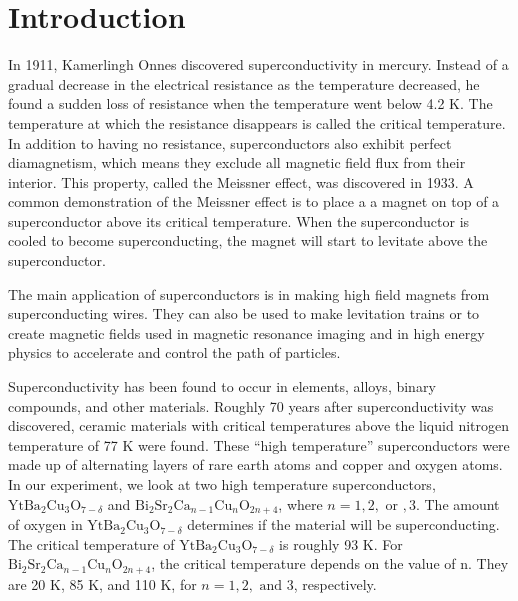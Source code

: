 \documentclass[prb,preprint]{revtex4-1}
\begin{document}
\maketitle %


\section{Introduction} %
In 1911, Kamerlingh Onnes discovered superconductivity in mercury.  
Instead of a gradual decrease in the electrical resistance as the temperature decreased, he found a sudden loss of resistance when the temperature went below 4.2 K. 
The temperature at which the resistance disappears is called the critical temperature.
In addition to having no resistance, superconductors also exhibit perfect diamagnetism, which means they exclude all magnetic field flux from their interior. 
This property, called the Meissner effect, was discovered in 1933.\cite{intro}
A common demonstration of the Meissner effect is to place a a magnet on top of a superconductor above its critical temperature. When the superconductor is cooled to become superconducting, the magnet will start to levitate above the superconductor. 

The main application of superconductors is in making high field magnets from superconducting wires. They can also be used to make levitation trains or to create magnetic fields used in magnetic resonance imaging and in high energy physics to accelerate and control the path of particles.\cite{kumar} 

Superconductivity has been found to occur in elements, alloys, binary compounds, and other materials.  
Roughly 70 years after superconductivity was discovered, ceramic materials with critical temperatures above the liquid nitrogen temperature of 77 K were found.\cite{melissinos} 
These ``high temperature'' superconductors were made up of alternating layers of rare earth atoms and copper and oxygen atoms.\cite{kumar} 
In our experiment, we look at two high temperature superconductors, $\textrm{Yt}\textrm{Ba}_{2}\textrm{Cu}_{3}\textrm{O}_{7-\delta}$ and $\textrm{Bi}_{2}\textrm{Sr}_{2}\textrm{Ca}_{n-1}\textrm{Cu}_{n}\textrm{O}_{2n+4}$, where $n=1,2,\textrm{ or },3$. %
The amount of oxygen in $\textrm{Yt}\textrm{Ba}_{2}\textrm{Cu}_{3}\textrm{O}_{7-\delta}$ determines if the material will be superconducting.\cite{colo} The critical temperature of $\textrm{Yt}\textrm{Ba}_{2}\textrm{Cu}_{3}\textrm{O}_{7-\delta}$ is roughly 93 K.\cite{ybcotemp}
For $\textrm{Bi}_{2}\textrm{Sr}_{2}\textrm{Ca}_{n-1}\textrm{Cu}_{n}\textrm{O}_{2n+4}$, the critical temperature depends on the value of n.  
They are 20 K, 85 K, and 110 K, for $n=1,2,\textrm{ and }3$, respectively.\cite{temps}
\end{document}
